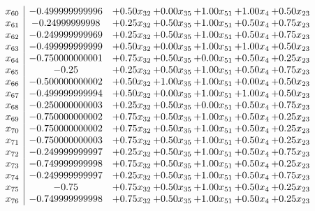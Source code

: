 \documentclass[8pt]{article}
\begin{document}
\[\begin{array}{c| c c@{\hskip 2pt} c@{\hskip 2pt} c@{\hskip 2pt} c@{\hskip 2pt} c@{\hskip 2pt} }
 x_{60}   &  -0.499999999996 & +  0.50 x_{32} & +  0.00 x_{35} & +  1.00 x_{51} & +  1.00 x_{4} & +  0.50 x_{23}\\
 x_{61}   &  -0.24999999998 & +  0.25 x_{32} & +  0.50 x_{35} & +  1.00 x_{51} & +  0.50 x_{4} & +  0.75 x_{23}\\
 x_{62}   &  -0.249999999969 & +  0.25 x_{32} & +  0.50 x_{35} & +  1.00 x_{51} & +  0.50 x_{4} & +  0.75 x_{23}\\
 x_{63}   &  -0.499999999999 & +  0.50 x_{32} & +  0.00 x_{35} & +  1.00 x_{51} & +  1.00 x_{4} & +  0.50 x_{23}\\
 x_{64}   &  -0.750000000001 & +  0.75 x_{32} & +  0.50 x_{35} & +  0.00 x_{51} & +  0.50 x_{4} & +  0.25 x_{23}\\
 x_{65}   &  -0.25 & +  0.25 x_{32} & +  0.50 x_{35} & +  1.00 x_{51} & +  0.50 x_{4} & +  0.75 x_{23}\\
 x_{66}   &  -0.500000000002 & +  0.50 x_{32} & +  1.00 x_{35} & +  1.00 x_{51} & +  0.00 x_{4} & +  0.50 x_{23}\\
 x_{67}   &  -0.499999999994 & +  0.50 x_{32} & +  0.00 x_{35} & +  1.00 x_{51} & +  1.00 x_{4} & +  0.50 x_{23}\\
 x_{68}   &  -0.250000000003 & +  0.25 x_{32} & +  0.50 x_{35} & +  0.00 x_{51} & +  0.50 x_{4} & +  0.75 x_{23}\\
 x_{69}   &  -0.750000000002 & +  0.75 x_{32} & +  0.50 x_{35} & +  1.00 x_{51} & +  0.50 x_{4} & +  0.25 x_{23}\\
 x_{70}   &  -0.750000000002 & +  0.75 x_{32} & +  0.50 x_{35} & +  1.00 x_{51} & +  0.50 x_{4} & +  0.25 x_{23}\\
 x_{71}   &  -0.750000000003 & +  0.75 x_{32} & +  0.50 x_{35} & +  1.00 x_{51} & +  0.50 x_{4} & +  0.25 x_{23}\\
 x_{72}   &  -0.249999999997 & +  0.25 x_{32} & +  0.50 x_{35} & +  1.00 x_{51} & +  0.50 x_{4} & +  0.75 x_{23}\\
 x_{73}   &  -0.749999999998 & +  0.75 x_{32} & +  0.50 x_{35} & +  1.00 x_{51} & +  0.50 x_{4} & +  0.25 x_{23}\\
 x_{74}   &  -0.249999999997 & +  0.25 x_{32} & +  0.50 x_{35} & +  1.00 x_{51} & +  0.50 x_{4} & +  0.75 x_{23}\\
 x_{75}   &  -0.75 & +  0.75 x_{32} & +  0.50 x_{35} & +  1.00 x_{51} & +  0.50 x_{4} & +  0.25 x_{23}\\
 x_{76}   &  -0.749999999998 & +  0.75 x_{32} & +  0.50 x_{35} & +  1.00 x_{51} & +  0.50 x_{4} & +  0.25 x_{23}\\

\end{array}\]
\end{document}
